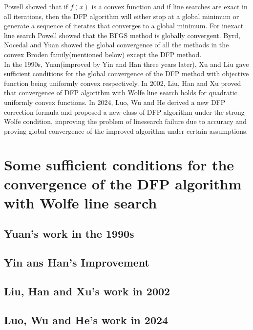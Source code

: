 \documentclass[12pt,a4paper,draft]{beamer}  %
\newcounter{cite}
\theoremstyle{definition}
\numberwithin{equation}{section}
\begin{document}
Powell\cite{Po1} showed that if $f(x)$ is a convex function and if line searches are exact in all iterations, then the DFP algorithm will either stop at a global minimum or generate a sequence of iterates that converges to a global minimum. 
For inexact line search Powell\cite{Po2} showed that the BFGS method is globally convergent. 
Byrd, Nocedal and Yuan\cite{BNY} showed the global convergence of all the methods in the convex Broden family(mentioned below) except the DFP method.\\ 
In the 1990s, Yuan\cite{Yuan}(improved by Yin and Han\cite{YH} three years later), Xu and Liu\cite{XL} gave sufficient conditions for the global convergence of the DFP method with objective function being uniformly convex respectively.
In 2002, Liu, Han and Xu\cite{LHX} proved that convergence of DFP algorithm with Wolfe line search holds for quadratic uniformly convex functions.
In 2024, Luo, Wu and He\cite{LWH} derived a new DFP correction formula and proposed a new class of DFP algorithm under the strong Wolfe condition, improving the problem of linesearch failure due to accuracy and proving global convergence of the improved algorithm under certain assumptions.



\section{Some sufficient conditions for the convergence of the DFP algorithm with Wolfe line search}

\subsection{Yuan's work in the 1990s}




\subsection{Yin ans Han's Improvement}

\subsection{Liu, Han and Xu's work in 2002}

\subsection{Luo, Wu and He's work in 2024}
\end{document}
